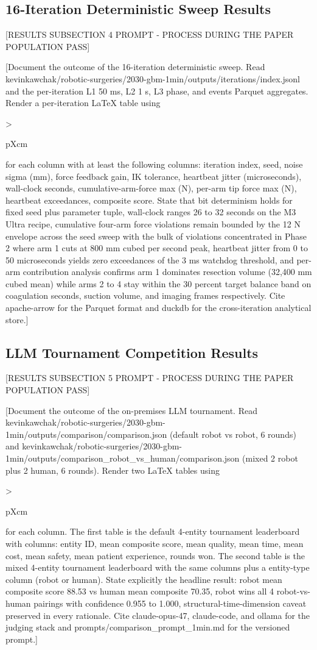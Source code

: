 \subsection{16-Iteration Deterministic Sweep Results}
\label{sec:results-iterations}

[RESULTS SUBSECTION 4 PROMPT - PROCESS DURING THE PAPER POPULATION PASS]

[Document the outcome of the 16-iteration deterministic sweep. Read
kevinkawchak/robotic-surgeries/2030-gbm-1min/outputs/iterations/index.jsonl
and the per-iteration L1 50 ms, L2 1 s, L3 phase, and events Parquet
aggregates. Render a per-iteration LaTeX table using
{>{\raggedright\arraybackslash}p{Xcm}} for each column with at least
the following columns: iteration index, seed, noise sigma (mm),
force feedback gain, IK tolerance, heartbeat jitter (microseconds),
wall-clock seconds, cumulative-arm-force max (N), per-arm tip force
max (N), heartbeat exceedances, composite score. State that bit
determinism holds for fixed seed plus parameter tuple, wall-clock
ranges 26 to 32 seconds on the M3 Ultra recipe, cumulative four-arm
force violations remain bounded by the 12 N envelope across the seed
sweep with the bulk of violations concentrated in Phase 2 where arm
1 cuts at 800 mm cubed per second peak, heartbeat jitter from 0 to
50 microseconds yields zero exceedances of the 3 ms watchdog
threshold, and per-arm contribution analysis confirms arm 1 dominates
resection volume (32,400 mm cubed mean) while arms 2 to 4 stay within
the 30 percent target balance band on coagulation seconds, suction
volume, and imaging frames respectively. Cite apache-arrow for the
Parquet format and duckdb for the cross-iteration analytical store.]

\subsection{LLM Tournament Competition Results}
\label{sec:results-competition}

[RESULTS SUBSECTION 5 PROMPT - PROCESS DURING THE PAPER POPULATION PASS]

[Document the outcome of the on-premises LLM tournament. Read
kevinkawchak/robotic-surgeries/2030-gbm-1min/outputs/comparison/comparison.json
(default robot vs robot, 6 rounds) and
kevinkawchak/robotic-surgeries/2030-gbm-1min/outputs/comparison_robot_vs_human/comparison.json
(mixed 2 robot plus 2 human, 6 rounds). Render two LaTeX tables
using {>{\raggedright\arraybackslash}p{Xcm}} for each column. The
first table is the default 4-entity tournament leaderboard with
columns: entity ID, mean composite score, mean quality, mean time,
mean cost, mean safety, mean patient experience, rounds won. The
second table is the mixed 4-entity tournament leaderboard with the
same columns plus a entity-type column (robot or human). State
explicitly the headline result: robot mean composite score 88.53 vs
human mean composite 70.35, robot wins all 4 robot-vs-human pairings
with confidence 0.955 to 1.000, structural-time-dimension caveat
preserved in every rationale. Cite claude-opus-47, claude-code, and
ollama for the judging stack and prompts/comparison_prompt_1min.md
for the versioned prompt.]


